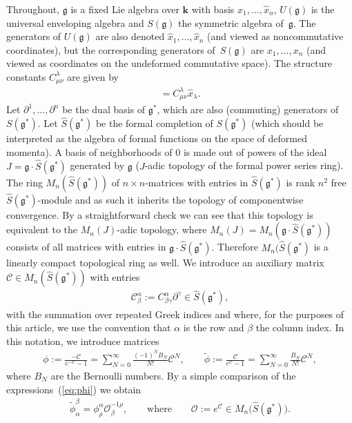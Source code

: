 \documentclass[pdftex]{sigma}
\def\genfd{\mathbf{k}}
\def\gg{\mathfrak{g}}
\def\CC{\mathcal{C}}
\def\OO{\mathcal{O}}
\def\hx{\hat{x}}
\numberwithin{equation}{section}
\begin{document}
Throughout, $\gg$ is a fixed Lie algebra over $\genfd$ with basis $\hx_1,\dots,\hx_n$, $U(\gg)$ is the universal enveloping algebra and $S(\gg)$ the symmetric algebra of~$\gg$. The generators of $U(\gg)$ are also denoted $\hx_1,\dots,\hx_n$ (and viewed as noncommutative coordinates), but the corresponding generators of~$S(\gg)$ are $x_1,\dots,x_n$ (and viewed as coordinates on the undeformed commutative space). The structure constants $C_{\mu\nu}^\lambda$ are given by
\begin{gather*}%
[\hx_\mu,\hx_\nu] = C_{\mu\nu}^\lambda \hx_\lambda.
\end{gather*}
Let $\partial^1,\dots,\partial^n$ be the dual basis of $\gg^*$, which are also (commuting) generators of $S(\gg^*)$. Let $\hat{S}(\gg^*)$ be the formal completion of $S(\gg^*)$ (which should be interpreted as the algebra of formal functions on the space of deformed momenta). A basis of neighborhoods of $0$ is made out of powers of the ideal $J = \gg\cdot\hat{S}(\gg^*)$ generated by $\gg$ ($J$-adic topology of the formal power series ring). The ring $M_n(\hat{S}(\gg^*))$ of $n\times n$-matrices with entries in $\hat{S}(\gg^*)$ is rank $n^2$ free $\hat{S}(\gg^*)$-module and as such it inherits the topology of componentwise convergence. By a straightforward check we can see that this topology is equivalent to the $M_n(J)$-adic topology, where $M_n(J) = M_n(\gg\cdot\hat{S}(\gg^*))$ consists of all matrices with entries in $\gg\cdot\hat{S}(\gg^*)$. Therefore $M_n(\hat{S}(\gg^*)$ is a linearly compact topological ring as well. We introduce an auxiliary matrix $\CC\in M_n(\hat{S}(\gg^*))$ with entries
\begin{gather}\label{CCmatrix}
\CC^\alpha_\beta := C^\alpha_{\beta\gamma}\partial^\gamma \in \hat{S}(\gg^*),
\end{gather}
with the summation over repeated Greek indices and where, for the purposes of this article, we use the convention that $\alpha$ is the row and $\beta$ the column index. In this notation, we introduce matrices
\begin{gather}\label{eq:phi}
\phi := \frac{-\CC}{e^{-\CC} -1} =\sum_{N=0}^\infty \frac{(-1)^N B_N}{N!} \CC^N, \qquad \tilde{\phi} := \frac{\CC}{e^{\CC} -1} =\sum_{N=0}^\infty \frac{B_N}{N!} \CC^N,
\end{gather}
where $B_N$ are the Bernoulli numbers. By a simple comparison of the expressions~(\ref{eq:phi}) we obtain
\begin{gather}\label{eq:phiphiO}
\tilde\phi_\alpha^\beta = \phi^\alpha_\rho \OO^{-1\rho}_\beta,\qquad \text{where}\qquad \OO := e^\CC\in M_n\big(\hat{S}(\gg^*)\big).
\end{gather}
\end{document}

